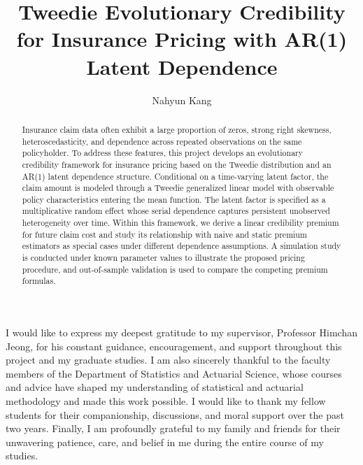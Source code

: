 \documentclass{sfuthesis}
\title{Tweedie Evolutionary Credibility for Insurance Pricing with AR(1) Latent Dependence}
\author{Nahyun Kang}
\numberwithin{equation}{chapter}
\begin{document}
\frontmatter
\maketitle{}
\makecommittee{}


\begin{abstract}

Insurance claim data often exhibit a large proportion of zeros, strong right skewness, heteroscedasticity, and dependence across repeated observations on the same policyholder. To address these features, this project develops an evolutionary credibility framework for insurance pricing based on the Tweedie distribution and an AR(1) latent dependence structure. Conditional on a time-varying latent factor, the claim amount is modeled through a Tweedie generalized linear model with observable policy characteristics entering the mean function. The latent factor is specified as a multiplicative random effect whose serial dependence captures persistent unobserved heterogeneity over time.
Within this framework, we derive a linear credibility premium for future claim cost and study its relationship with naive and static premium estimators as special cases under different dependence assumptions. A simulation study is conducted under known parameter values to illustrate the proposed pricing procedure, and out-of-sample validation is used to compare the competing premium formulas. 

\end{abstract}




\begin{acknowledgements}
I would like to express my deepest gratitude to my supervisor, Professor Himchan Jeong, for his constant guidance, encouragement, and support throughout this project and my graduate studies. I am also sincerely thankful to the faculty members of the Department of Statistics and Actuarial Science, whose courses and advice have shaped my understanding of statistical and actuarial methodology and made this work possible. I would like to thank my fellow students for their companionship, discussions, and moral support over the past two years. Finally, I am profoundly grateful to my family and friends for their unwavering patience, care, and belief in me during the entire course of my studies.
\end{acknowledgements}
\end{document}
